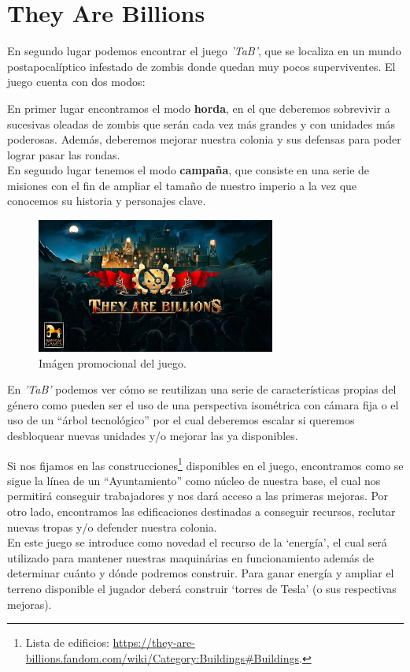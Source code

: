 \section{They Are Billions}
En segundo lugar podemos encontrar el juego \textit{'\acf{TaB}'}, que se localiza en un
mundo postapocalíptico infestado de zombis donde quedan muy pocos superviventes. El juego
cuenta con dos modos:

En primer lugar encontramos el modo \textbf{horda}, en el que deberemos sobrevivir a
sucesivas oleadas de zombis que serán cada vez más grandes y con unidades más poderosas.
Además, deberemos mejorar nuestra colonia y sus defensas para poder lograr pasar las rondas.\\
En segundo lugar tenemos el modo \textbf{campaña}, que consiste en una serie de misiones con el
fin de ampliar el tamaño de nuestro imperio a la vez que conocemos su historia y personajes
clave. 

\begin{figure}[ht]
\centering
\includegraphics[width=0.7\textwidth]{imagenes/marco_teo/referentes/tab_1.png}
\caption{Imágen promocional del juego.}
\label{img:tab_1}
\end{figure}

En \textit{'\ac{TaB}'} podemos ver cómo se reutilizan una serie de características propias
del género como pueden ser el uso de una perspectiva isométrica con cámara fija o el uso de
un ``árbol tecnológico'' por el cual deberemos escalar si queremos desbloquear nuevas unidades
y/o mejorar las ya disponibles.

Si nos fijamos en las construcciones\footnote{Lista de edificios: \url{https://they-are-billions.fandom.com/wiki/Category:Buildings\#Buildings}.}
disponibles en el juego, encontramos como se sigue la línea de un ``Ayuntamiento'' como núcleo
de nuestra base, el cual nos permitirá conseguir trabajadores y nos dará acceso a las primeras
mejoras. Por otro lado, encontramos las edificaciones destinadas a conseguir recursos, reclutar
nuevas tropas y/o defender nuestra colonia. \\
En este juego se introduce como novedad el recurso de la `energía', el cual será utilizado
para mantener nuestras maquinárias en funcionamiento además de determinar cuánto y dónde podremos construir.  
Para ganar energía y ampliar el terreno disponible el jugador deberá construir `torres de Tesla' (o sus respectivas mejoras).


